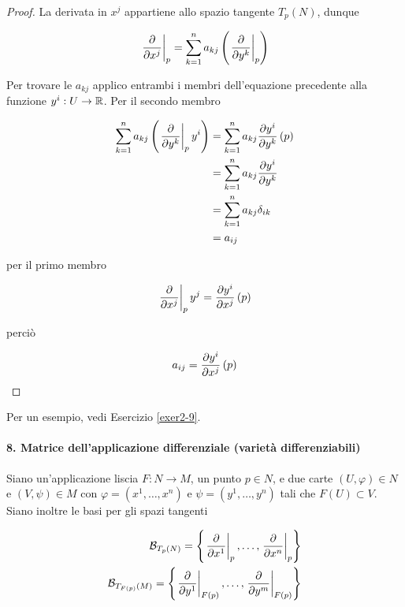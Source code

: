 \begin{proof}
	La derivata in $ x^{j} $ appartiene allo spazio tangente $ T_{p}(N) $, dunque
	
	\begin{equation}
		\eval{ \pdv{x^{j}} }_{p} = \sum_{k=1}^{n} a_{kj} \left( \eval{ \pdv{y^{k}} }_{p} \right)
	\end{equation}

	Per trovare le $ a_{kj} $ applico entrambi i membri dell'equazione precedente alla funzione $ y^{i} : U \to \mathbb{R} $. Per il secondo membro
	
	\begin{align}
		\begin{split}
			\sum_{k=1}^{n} a_{kj} \left( \eval{ \pdv{y^{k}} }_{p} y^{i} \right) &= \sum_{k=1}^{n} a_{kj} \pdv{y^{i}}{y^{k}} \, (p) \\
			&= \sum_{k=1}^{n} a_{kj} \pdv{y^{i}}{y^{k}} \\
			&= \sum_{k=1}^{n} a_{kj} \delta_{ik} \\
			&= a_{ij}
		\end{split}
	\end{align}

	per il primo membro
	
	\begin{equation}
		\eval{ \pdv{x^{j}} }_{p} y^{j} = \pdv{y^{i}}{x^{j}} \, (p)
	\end{equation}

	perciò
	
	\begin{equation}
		a_{ij} = \pdv{y^{i}}{x^{j}} \, (p)
	\end{equation}
\end{proof}

Per un esempio, vedi Esercizio \ref{exer2-9}.

\paragraph{8. Matrice dell'applicazione differenziale (varietà differenziabili)}

Siano un'applicazione liscia $ F : N \to M $, un punto $ p \in N $, e due carte $ (U,\varphi) \in N $ e $ (V,\psi) \in M $ con $ \varphi = (x^{1},\dots,x^{n}) $ e $ \psi = (y^{1},\dots,y^{n}) $ tali che $ F(U) \subset V $. Siano inoltre le basi per gli spazi tangenti

\begin{align}
	\B_{T_{p}(N)} = \left\{ \eval{ \pdv{x^{1}} }_{p}, \dots, \eval{ \pdv{x^{n}} }_{p} \right\} \\
	\B_{T_{F(p)}(M)} = \left\{ \eval{ \pdv{y^{1}} }_{F(p)}, \dots, \eval{ \pdv{y^{m}} }_{F(p)} \right\}
\end{align}

